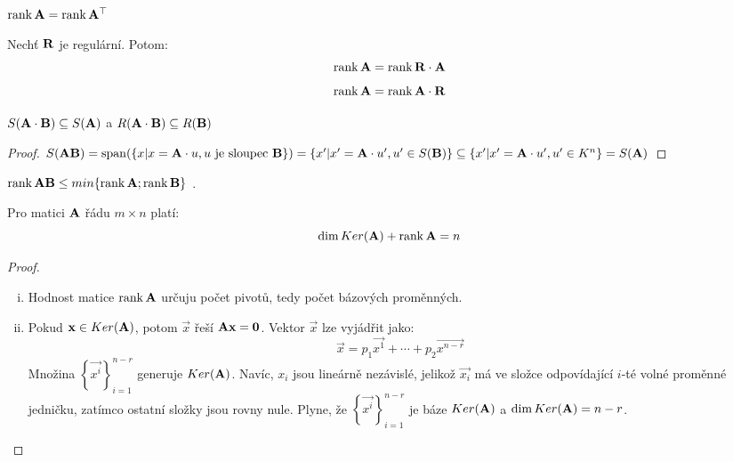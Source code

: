 \begin{corollary}
    $\mathop{\mathrm{rank}} \mathbf{A} = \mathop{\mathrm{rank}} \mathbf{A}^{\top}$
\end{corollary}

\begin{corollary}
    Nechť $\mathbf{R}$ je regulární. Potom: 
            $$\mathop{\mathrm{rank}} \mathbf{A} = \mathop{\mathrm{rank}} \mathbf{R} \cdot \mathbf{A}$$
            $$\mathop{\mathrm{rank}} \mathbf{A} = \mathop{\mathrm{rank}} \mathbf{A} \cdot \mathbf{R}$$
\end{corollary}

\begin{corollary}
    $S(\mathbf{A} \cdot \mathbf{B}) \subseteq S(\mathbf{A})$ a 
            $R(\mathbf{A} \cdot \mathbf{B}) \subseteq R(\mathbf{B})$
\end{corollary}

\begin{proof}
    $S(\mathbf{AB}) = \mathop{\mathrm{span}}(\{x | x=\mathbf{A}\cdot u, \text{$u$ je sloupec 
    $\mathbf{B}$}\})
    = \{x' | x' = \mathbf{A} \cdot u', u' \in S(\mathbf{B}) \} \subseteq
    \{x' | x' = \mathbf{A} \cdot u', u' \in K^n \} = S(\mathbf{A})$
\end{proof}

\begin{corollary}
    $\mathop{\mathrm{rank}} \mathbf{AB} \leq min \{ \mathop{\mathrm{rank}} \mathbf{A}; \mathop{\mathrm{rank}} \mathbf{B} \}$ .
\end{corollary}

\begin{proposition}
    Pro matici $\mathbf{A}$ řádu $m \times n$ platí:
    $$\mathop{\mathrm{dim}} Ker(\mathbf{A}) + \mathop{\mathrm{rank}} \mathbf{A} = n$$
\end{proposition}

\begin{proof}
    \leavevmode
    \begin{enumerate}[i.]
        \item Hodnost matice $\mathop{\mathrm{rank}} \mathbf{A}$ určuju počet pivotů, tedy
            počet bázových proměnných.
        \item Pokud $\mathbf{x} \in Ker(\mathbf{A})$, potom $\vec{x}$ řeší 
            $\mathbf{A}\mathbf{x} = \mathbf{0}$. Vektor $\vec{x}$ lze vyjádřit jako:
            $$\vec{x} = p_1\vec{x^1} + \cdots + p_2\vec{x^{n-r}}$$
            Množina $\left\{\vec{x^i}\right\}^{n-r}_{i=1}$ generuje 
            $Ker(\mathbf{A})$. Navíc, $x_i$ jsou lineárně nezávislé, 
            jelikož $\vec{x_i}$ má ve složce odpovídající $i$-té volné proměnné 
            jedničku, zatímco ostatní složky jsou rovny nule. 
            Plyne, že $\left\{\vec{x^i}\right\}^{n-r}_{i=1}$ je báze
            $Ker(\mathbf{A})$ a $\mathop{\mathrm{dim}} Ker(\mathbf{A}) = n-r$.
    \end{enumerate}
\end{proof}
